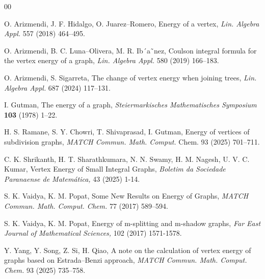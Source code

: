\documentclass[12pt]{article}
\theoremstyle{plain}
\theoremstyle{remark}
\theoremstyle{definition}
\begin{document}
\begin{thebibliography}{00}
	
	O. Arizmendi, J. F. Hidalgo, O. Juarez–Romero, Energy of a vertex,
	\textit{Lin. Algebra Appl.} 557 (2018) 464–495.
	
	 O. Arizmendi, B. C. Luna–Olivera, M. R. Ib´a˜nez, Coulson integral
	formula for the vertex energy of a graph, \textit{Lin. Algebra Appl.} 580
	(2019) 166–183.
	
	 O. Arizmendi, S. Sigarreta, The change of vertex energy when joining
	trees, \textit{Lin. Algebra Appl.} 687 (2024) 117–131.
	
	 I. Gutman, The energy of a graph, \textit{Steiermarkisches Mathematisches Symposium\/}
	\textbf{103} (1978) 1--22.
	
	
	
	
	 H. S. Ramane, S. Y. Chowri, T. Shivaprasad, I. Gutman, Energy
	of vertices of subdivision graphs, \textit{MATCH Commun. Math. Comput.}
	Chem. 93 (2025) 701–711.
	
	 C. K. Shrikanth, H. T. Sharathkumara, N. N. Swamy, H. M. Nagesh, U. V. C. Kumar, Vertex Energy of Small Integral Graphs, \textit{Boletim da Sociedade Paranaense de Matemática,} 43 (2025) 1-14.
	
	
	 S. K. Vaidya, K. M. Popat, Some New Results on Energy of Graphs,\textit{ MATCH Commun. Math. Comput. Chem.} 77 (2017) 589–594.
	
	 S. K. Vaidya, K. M. Popat, Energy of m-splitting and m-shadow graphs, \textit{Far East Journal of Mathematical Sciences,} 102 (2017) 1571-1578.
	
	 Y. Yang, Y. Song, Z. Si, H. Qiao, A note on the calculation of vertex
	energy of graphs based on Estrada–Benzi approach,\textit{ MATCH Commun. Math. Comput. Chem.} 93 (2025) 735–758.
	
	
\end{thebibliography}
\end{document}
